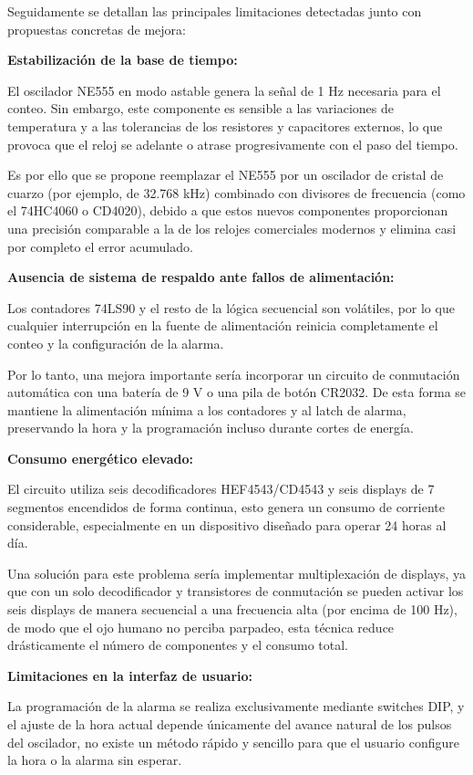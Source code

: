 \documentclass[12pt,letterpaper]{article}
\begin{document}
\indent Seguidamente se detallan las principales limitaciones detectadas junto con propuestas concretas de mejora:

\textbf{Estabilización de la base de tiempo:}

\indent El oscilador NE555 en modo astable genera la señal de 1 Hz necesaria para el conteo. Sin embargo, este componente es sensible a las variaciones de temperatura y a las tolerancias de los resistores y capacitores externos, lo que provoca que el reloj se adelante o atrase progresivamente con el paso del tiempo.

\indent Es por ello que se propone reemplazar el NE555 por un oscilador de cristal de cuarzo (por ejemplo, de 32.768 kHz) combinado con divisores de frecuencia (como el 74HC4060 o CD4020), debido a que estos nuevos componentes proporcionan una precisión comparable a la de los relojes comerciales modernos y elimina casi por completo el error acumulado.

\textbf{Ausencia de sistema de respaldo ante fallos de alimentación:}

\indent Los contadores 74LS90 y el resto de la lógica secuencial son volátiles, por lo que cualquier interrupción en la fuente de alimentación reinicia completamente el conteo y la configuración de la alarma.

\indent Por lo tanto, una mejora importante sería incorporar un circuito de conmutación automática con una batería de 9 V o una pila de botón CR2032. De esta forma se mantiene la alimentación mínima a los contadores y al latch de alarma, preservando la hora y la programación incluso durante cortes de energía.

\textbf{Consumo energético elevado:}

\indent El circuito utiliza seis decodificadores HEF4543/CD4543 y seis displays de 7 segmentos encendidos de forma continua, esto genera un consumo de corriente considerable, especialmente en un dispositivo diseñado para operar 24 horas al día.

\indent Una solución para este problema sería implementar multiplexación de displays, ya que con un solo decodificador y transistores de conmutación se pueden activar los seis displays de manera secuencial a una frecuencia alta (por encima de 100 Hz), de modo que el ojo humano no perciba parpadeo, esta técnica reduce drásticamente el número de componentes y el consumo total.

\textbf{Limitaciones en la interfaz de usuario:}

\indent La programación de la alarma se realiza exclusivamente mediante switches DIP, y el ajuste de la hora actual depende únicamente del avance natural de los pulsos del oscilador, no existe un método rápido y sencillo para que el usuario configure la hora o la alarma sin esperar.
\end{document}
